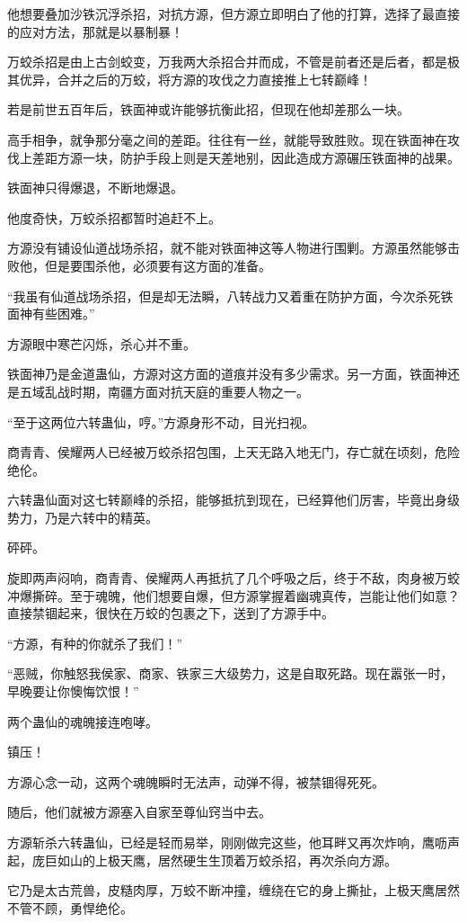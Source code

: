 \begin{this_body}
他想要叠加沙铁沉浮杀招，对抗方源，但方源立即明白了他的打算，选择了最直接的应对方法，那就是以暴制暴！

万蛟杀招是由上古剑蛟变，万我两大杀招合并而成，不管是前者还是后者，都是极其优异，合并之后的万蛟，将方源的攻伐之力直接推上七转巅峰！

若是前世五百年后，铁面神或许能够抗衡此招，但现在他却差那么一块。

高手相争，就争那分毫之间的差距。往往有一丝，就能导致胜败。现在铁面神在攻伐上差距方源一块，防护手段上则是天差地别，因此造成方源碾压铁面神的战果。

铁面神只得爆退，不断地爆退。

他度奇快，万蛟杀招都暂时追赶不上。

方源没有铺设仙道战场杀招，就不能对铁面神这等人物进行围剿。方源虽然能够击败他，但是要围杀他，必须要有这方面的准备。

“我虽有仙道战场杀招，但是却无法瞬，八转战力又着重在防护方面，今次杀死铁面神有些困难。”

方源眼中寒芒闪烁，杀心并不重。

铁面神乃是金道蛊仙，方源对这方面的道痕并没有多少需求。另一方面，铁面神还是五域乱战时期，南疆方面对抗天庭的重要人物之一。

“至于这两位六转蛊仙，哼。”方源身形不动，目光扫视。

商青青、侯耀两人已经被万蛟杀招包围，上天无路入地无门，存亡就在顷刻，危险绝伦。

六转蛊仙面对这七转巅峰的杀招，能够抵抗到现在，已经算他们厉害，毕竟出身级势力，乃是六转中的精英。

砰砰。

旋即两声闷响，商青青、侯耀两人再抵抗了几个呼吸之后，终于不敌，肉身被万蛟冲爆撕碎。至于魂魄，他们想要自爆，但方源掌握着幽魂真传，岂能让他们如意？直接禁锢起来，很快在万蛟的包裹之下，送到了方源手中。

“方源，有种的你就杀了我们！”

“恶贼，你触怒我侯家、商家、铁家三大级势力，这是自取死路。现在嚣张一时，早晚要让你懊悔饮恨！”

两个蛊仙的魂魄接连咆哮。

镇压！

方源心念一动，这两个魂魄瞬时无法声，动弹不得，被禁锢得死死。

随后，他们就被方源塞入自家至尊仙窍当中去。

方源斩杀六转蛊仙，已经是轻而易举，刚刚做完这些，他耳畔又再次炸响，鹰呖声起，庞巨如山的上极天鹰，居然硬生生顶着万蛟杀招，再次杀向方源。

它乃是太古荒兽，皮糙肉厚，万蛟不断冲撞，缠绕在它的身上撕扯，上极天鹰居然不管不顾，勇悍绝伦。


\end{this_body}
